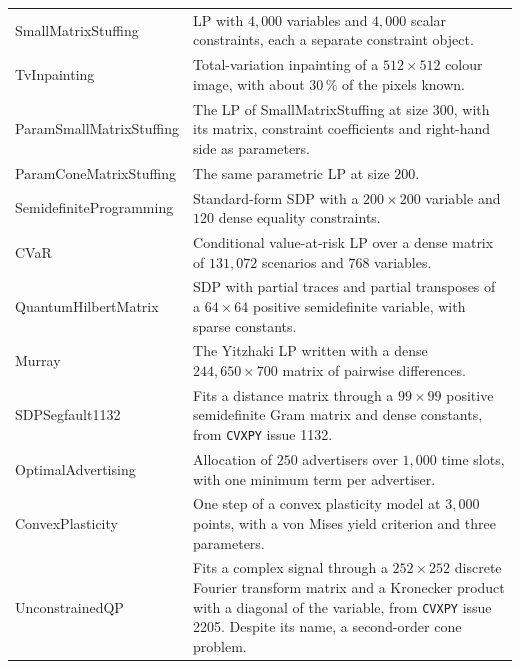 \documentclass[letterpaper,12pt]{article}
\newcommand{\ac}[1]{#1}
\begin{document}
{\begin{longtable}{l >{\raggedright\arraybackslash}p{9.6cm}}
SmallMatrixStuffing & \ac{LP} with $4{,}000$ variables and $4{,}000$ scalar constraints, each a separate constraint object. \\
TvInpainting & Total-variation inpainting of a $512 \times 512$ colour image, with about $30\,\%$ of the pixels known. \\
ParamSmallMatrixStuffing & The \ac{LP} of SmallMatrixStuffing at size $300$, with its matrix, constraint coefficients and right-hand side as parameters. \\
ParamConeMatrixStuffing & The same parametric \ac{LP} at size $200$. \\
SemidefiniteProgramming & Standard-form \ac{SDP} with a $200 \times 200$ variable and $120$ dense equality constraints. \\
CVaR & Conditional value-at-risk \ac{LP} over a dense matrix of $131{,}072$ scenarios and $768$ variables. \\
QuantumHilbertMatrix & \ac{SDP} with partial traces and partial transposes of a $64 \times 64$ positive semidefinite variable, with sparse constants. \\
Murray & The Yitzhaki \ac{LP} written with a dense $244{,}650 \times 700$ matrix of pairwise differences. \\
SDPSegfault1132 & Fits a distance matrix through a $99 \times 99$ positive semidefinite Gram matrix and dense constants, from \texttt{CVXPY} issue 1132. \\
OptimalAdvertising & Allocation of $250$ advertisers over $1{,}000$ time slots, with one minimum term per advertiser. \\
ConvexPlasticity & One step of a convex plasticity model at $3{,}000$ points, with a von Mises yield criterion and three parameters. \\
UnconstrainedQP & Fits a complex signal through a $252 \times 252$ discrete Fourier transform matrix and a Kronecker product with a diagonal of the variable, from \texttt{CVXPY} issue 2205. Despite its name, a second-order cone problem. \\
\end{longtable}}
\end{document}
